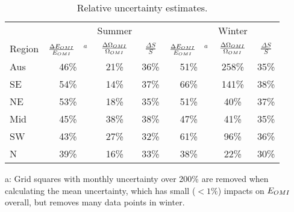   \begin{table}\begin{threeparttable}
      \caption{Relative uncertainty estimates.}
      \begin{tabular}{ l | c  c  c | c c c} 
        \toprule
        & & Summer & & & Winter & \\
        Region & $\frac{\Delta E_{OMI}}{E_{OMI}}$ ~$^a$ & $\frac{\Delta \Omega_{OMI}}{\Omega_{OMI}}$ & $\frac{\Delta S}{S}$ 
          & $\frac{\Delta E_{OMI}}{E_{OMI}}$ ~$^a$ & $\frac{\Delta \Omega_{OMI}}{\Omega_{OMI}}$ & $\frac{\Delta S}{S}$ \\
        \midrule
          Aus &   46\% &   21\% &   36\% &   51\% &  258\% &   35\% \\
          SE &   54\% &   14\% &   37\% &   66\% &  141\% &   38\% \\
          NE &   53\% &   18\% &   35\% &   51\% &   40\% &   37\% \\
          Mid &   45\% &   38\% &   38\% &   47\% &   41\% &   35\% \\
          SW &   43\% &   27\% &   32\% &   61\% &   96\% &   36\% \\
          N &   39\% &   16\% &   33\% &   38\% &   22\% &   30\% \\
        \bottomrule
      \end{tabular}
      \begin{tablenotes} 
        \small
        \item a: Grid squares with monthly uncertainty over 200\% are removed when calculating the mean uncertainty, which has small ($<1\%$) impacts on $E_{OMI}$ overall, but removes many data points in winter. 
      \end{tablenotes}
      \label{BioIsop:uncertainty:tab_uncertainties}
    \end{threeparttable}\end{table}
    

%    
    
